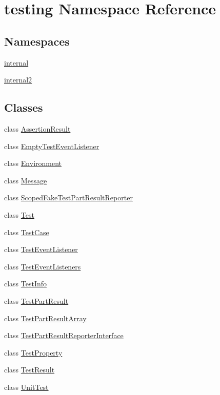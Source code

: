 \hypertarget{namespacetesting}{\section{testing Namespace Reference}
\label{namespacetesting}
}
\subsection*{Namespaces}
\begin{DoxyCompactItemize}
\item 
 \hyperlink{namespacetesting_1_1internal}{internal}
\item 
 \hyperlink{namespacetesting_1_1internal2}{internal2}
\end{DoxyCompactItemize}
\subsection*{Classes}
\begin{DoxyCompactItemize}
\item 
class \hyperlink{classtesting_1_1_assertion_result}{Assertion\+Result}
\item 
class \hyperlink{classtesting_1_1_empty_test_event_listener}{Empty\+Test\+Event\+Listener}
\item 
class \hyperlink{classtesting_1_1_environment}{Environment}
\item 
class \hyperlink{classtesting_1_1_message}{Message}
\item 
class \hyperlink{classtesting_1_1_scoped_fake_test_part_result_reporter}{Scoped\+Fake\+Test\+Part\+Result\+Reporter}
\item 
class \hyperlink{classtesting_1_1_test}{Test}
\item 
class \hyperlink{classtesting_1_1_test_case}{Test\+Case}
\item 
class \hyperlink{classtesting_1_1_test_event_listener}{Test\+Event\+Listener}
\item 
class \hyperlink{classtesting_1_1_test_event_listeners}{Test\+Event\+Listeners}
\item 
class \hyperlink{classtesting_1_1_test_info}{Test\+Info}
\item 
class \hyperlink{classtesting_1_1_test_part_result}{Test\+Part\+Result}
\item 
class \hyperlink{classtesting_1_1_test_part_result_array}{Test\+Part\+Result\+Array}
\item 
class \hyperlink{classtesting_1_1_test_part_result_reporter_interface}{Test\+Part\+Result\+Reporter\+Interface}
\item 
class \hyperlink{classtesting_1_1_test_property}{Test\+Property}
\item 
class \hyperlink{classtesting_1_1_test_result}{Test\+Result}
\item 
class \hyperlink{classtesting_1_1_unit_test}{Unit\+Test}
\end{DoxyCompactItemize}
